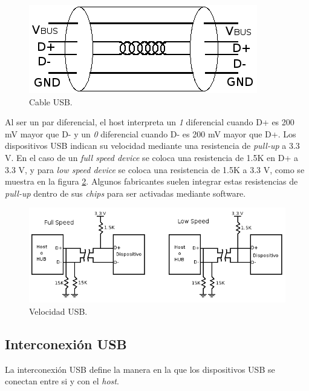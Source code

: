 \begin{figure}[htp]
\centering
\includegraphics[scale=0.5]{./img/electric_usb.png}
\caption{Cable USB.}
\label{fig:electric_usb}
\end{figure}

Al ser un par diferencial, el host interpreta un \emph{1} diferencial cuando D+
es 200 mV mayor que D- y un \emph{0} diferencial cuando D- es 200 mV mayor que
D+. 
Los dispositivos USB indican su velocidad mediante una resistencia de
\emph{pull-up} a 3.3 V. En el caso de un \emph{full speed device} se coloca
una resistencia de 1.5K en D+ a 3.3 V, y para \emph{low speed device} se coloca
una resistencia de 1.5K a 3.3 V, como se muestra en la figura
\ref{fig:electric_speed_usb}.
Algunos fabricantes suelen integrar estas resistencias de \emph{pull-up} dentro
de sus \emph{chips} para ser activadas mediante software.

\begin{figure}[htp]
\centering
\includegraphics[scale=0.5]{./img/electric_speed_usb.png}
\caption{Velocidad USB.}
\label{fig:electric_speed_usb}
\end{figure}


\subsection{Interconexi\'on USB}

La interconexi\'on USB define la manera en la que los dispositivos USB se
conectan entre si y con el \emph{host}. 

